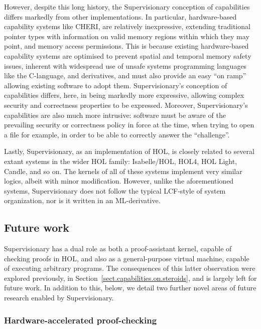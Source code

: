 \documentclass[a4paper, UKenglish, cleveref, autoref, thm-restate, colorlinks]{lipics-v2021}
\begin{document}
However, despite this long history, the Supervisionary conception of capabilities differs markedly from other implementations.
In particular, hardware-based capability systems like CHERI, are relatively inexpressive, extending traditional pointer types with information on valid memory regions within which they may point, and memory access permissions.
This is because existing hardware-based capability systems are optimised to prevent spatial and temporal memory safety issues, inherent with widespread use of unsafe systems programming languages like the C-language, and derivatives, and must also provide an easy ``on ramp'' allowing existing software to adopt them.
Supervisionary's conception of capabilities differs, here, in being markedly more expressive, allowing complex security and correctness properties to be expressed.
Moreover, Supervisionary's capabilities are also much more intrusive: software must be aware of the prevailing security or correctness policy in force at the time, when trying to open a file for example, in order to be able to correctly answer the ``challenge''.

Lastly, Supervisionary, as an implementation of HOL, is closely related to several extant systems in the wider HOL family: Isabelle/HOL, HOL4, HOL Light, Candle, and so on.
The kernels of all of these systems implement very similar logics, albeit with minor modification.
However, unlike the aforementioned systems, Supervisionary does not follow the typical LCF-style of system organization, nor is it written in an ML-derivative.

\subsection{Future work}
\label{subsect.future.work}

Supervisionary has a dual role as both a proof-assistant kernel, capable of checking proofs in HOL, and also as a general-purpose virtual machine, capable of executing arbitrary programs.
The consequences of this latter observation were explored previously, in Section~\ref{sect.capabilities.on.steroids}, and is largely left for future work.
In addition to this, below, we detail two further novel areas of future research enabled by Supervisionary.

\subsubsection*{Hardware-accelerated proof-checking}
\end{document}
